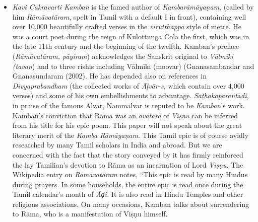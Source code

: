 \begin{itemize}
\item \textit{Kavi Cakravarti Kamban} is the famed author of \textit{Kambarāmāyaṇam}, (called by him \textit{Rāmāvatāram}, spelt in Tamil with a default I in front), containing well over 10,000 beautifully crafted verses in the \textit{virutthappā} style of metre. He was a court poet during the reign of Kulottunga Coļa the first, which was in the late 11th century and the beginning of the twelfth. Kamban’s preface (\textit{Rāmāvatāram, pāyiram}) acknowledges the Sanskrit original to \textit{Vālmīki (tavan}) and to three rishis including Vālmīki (moovar) (Gnanasambandar and Gnanasundaram (2002). He has depended also on references in \textit{Divyaprabandham} (the collected works of \textit{Āļvār-s,} which contain over 4,000 verses) and some of his own embellishments to advantage. \textit{Saṭhakoparant}ā\textit{di}, in praise of the famous Āļvār, Nammāļvār is reputed to be \textit{Kamban}’s work. Kamban’s conviction that Rāma was an \textit{avatāra} of \textit{Viṣṇu} can be inferred from his title for his epic poem. This paper will not speak about the great literary merit of the \textit{Kamba Rāmāyaņam}. This Tamil epic is of course avidly researched by many Tamil scholars in India and abroad. But we are concerned with the fact that the story conveyed by it has firmly reinforced the lay Tamilian’s devotion to Rāma as an incarnation of Lord \textit{Viṣṇu}. The Wikipedia entry on \textit{Rāmāvatāram} notes, “This epic is read by many Hindus during prayers. In some households, the entire epic is read once during the Tamil calendar's month of \textit{Āḑi.} It is also read in Hindu Temples and other religious associations. On many occasions, Kamban talks about surrendering to Rāma, who is a manifestation of Viṣṇu himself.


\end{itemize}
